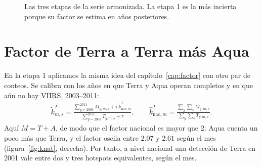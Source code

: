 \begin{figure}[H]
\centering
{}
\caption{Las tres etapas de la serie armonizada. La etapa 1 es la más incierta porque su factor se estima en años posteriores.}\label{fig:etapas}
\end{figure}

\section{Factor de Terra a Terra más Aqua}\label{sec:terra}

En la etapa 1 aplicamos la misma idea del capítulo~\ref{cap:factor} con otro par de conteos. Se calibra con los años en que Terra y Aqua operan completos y en que aún no hay VIIRS, 2003--2011:
\begin{align*}
  \widetilde k^{T}_{m,s}=\frac{\sum_{y=2003}^{2011}M_{y,m,s}+\tau\,\widehat k^{T}_{\mathrm{nac},m}}{\sum_{y=2003}^{2011}T_{y,m,s}+\tau},\qquad
  \widehat k^{T}_{\mathrm{nac},m}=\frac{\sum_y\sum_sM_{y,m,s}}{\sum_y\sum_sT_{y,m,s}}.
\end{align*}
Aquí $M=T+A$, de modo que el factor nacional es mayor que 2: Aqua cuenta un poco más que Terra, y el factor oscila entre $2.07$ y $2.61$ según el mes (figura~\ref{fig:knat}, derecha). Por tanto, a nivel nacional una detección de Terra en 2001 vale entre dos y tres hotspots equivalentes, según el mes.

